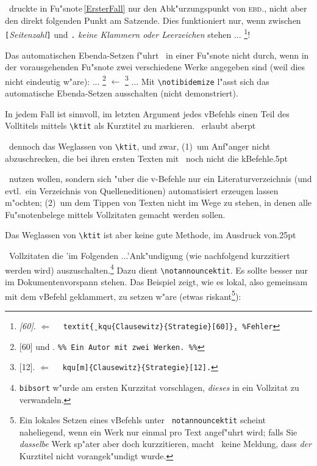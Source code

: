 \documentclass[12pt,a4paper]{article}
\newcommand{\pdfko}[1]{\kern #1pt
                          \strut\ignorespaces}%
\newcommand{\pbs}{\string\ \unskip}
\newcommand{\bs}{\protect\pbs}
\begin{document}
\BibArts\ druckte in Fu"snote\,\ref{ErsterFall} nur den Abk"urzungspunkt von \textsc{ebd.}, 
nicht aber den direkt folgenden Punkt am Satzende. Dies funktioniert nur, 
wenn zwischen \verb|[|\textit{Seitenzahl}\verb|]| und \verb|.|
\textit{keine Klammern oder Leerzeichen} stehen ... \footnote{\textit{[60]}.
\hspace{5.68em} $\Leftarrow$ \ \texttt{\bs textit\b{\{}\bs kqu\{Clausewitz\}\{Strategie\}[60]\b{\}}.
\texttt{\%Fehler}}}!

Das automatischen Ebenda-Setzen f"uhrt \BibArts\ in einer Fu"snote nicht durch, 
wenn in der vorausgehenden Fu"snote zwei verschiedene Werke angegeben sind 
(weil dies nicht eindeutig w"are): ...
\footnote{[60] und .
\hspace{3em} \texttt{\%\% Ein Autor mit zwei Werken. \%\%}}
$\leftarrow$
\footnote{[12]. 
\hspace{3.85em} $\Leftarrow$ \ \texttt{\bs kqu[m]\{Clausewitz\}\{Strategie\}[12].}}
... Mit \verb|\notibidemize| l"asst sich das automatische Ebenda-Setzen ausschalten
(nicht demonstriert).

In jedem Fall ist sinnvoll, im letzten Argument jedes v\fhy Befehls 
einen Teil des Volltitels mittels \verb|\ktit| als Kurztitel zu
markieren. \BibArts\ erlaubt aber\pdfko{1}\ 
dennoch das Weglassen von \verb|\ktit|, und zwar, (1)~um
Anf"anger nicht abzuschrecken, die bei ihren ersten Texten mit \BibArts\
noch nicht die k\fhy Befehle\pdfko{.5}\ 
nutzen wollen, sondern sich "uber die v-Befehle nur
ein Literaturverzeichnis (und evtl.\ ein Verzeichnis von Quelleneditionen)
automatisiert erzeugen lassen m"ochten; (2)~um dem Tippen von Texten nicht im
Wege zu stehen, in denen alle Fu"snotenbelege mittels Vollzitaten
gemacht werden sollen. 

Das Weglassen von \verb|\ktit| ist aber keine gute Methode, im Ausdruck von\pdfko{.25}\
Vollzitaten die 'im Folgenden ...'\hy Ank"undigung (wie nachfolgend 
kurzzitiert werden wird) auszuschalten.\footnote{\texttt{bibsort}
w"urde am ersten Kurzzitat vorschlagen, \textit{dieses} in ein Vollzitat zu
verwandeln.} Dazu dient \verb|\notannouncektit|. 
Es sollte besser nur im Dokumentenvorspann stehen. Das Beispiel zeigt, 
wie es lokal, also gemeinsam mit dem v\fhy Befehl geklammert, zu setzen w"are
(etwas riskant\footnote{Ein lokales Setzen eines v\fhy Befehls unter 
\texttt{\bs notannouncektit} scheint naheliegend, wenn ein Werk nur 
einmal pro Text angef"uhrt wird; falls Sie \textit{dasselbe} Werk 
sp"ater aber doch kurzzitieren, macht \BibArts\ keine Meldung, dass
\textit{der} Kurztitel nicht vorangek"undigt wurde.}):
\end{document}
